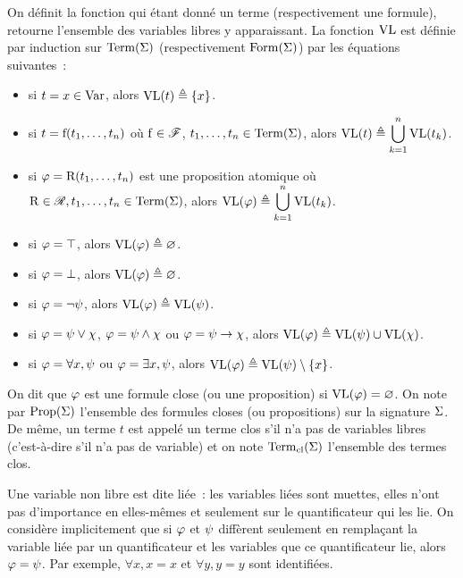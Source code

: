 \begin{definition}
  On définit la fonction qui étant donné un terme (respectivement une formule),
  retourne l'ensemble des variables libres y apparaissant. La fonction $\operatorname{VL}$ est
  définie par induction sur $\operatorname{Term}(\Sigma)$ (respectivement $\operatorname{Form}(\Sigma)$)
  par les équations suivantes~:
  \begin{itemize}
  \item si $t = x\in \operatorname{Var}$, alors $\operatorname{VL}(t) \triangleq \{x\}$.
  \item si $t = \mathrm{f}(t_1,\ldots,t_n)$ où $\mathrm{f}\in \mathscr F$,
    $t_1,\ldots,t_n\in\operatorname{Term}(\Sigma)$, alors
    $\displaystyle\operatorname{VL}(t) \triangleq \bigcup_{k = 1}^n \operatorname{VL}(t_k)$.
  \item si $\varphi = \mathrm{R}(t_1,\ldots,t_n)$ est une proposition
    atomique où $\mathrm{R}\in\mathscr R, t_1,\ldots,t_n\in\operatorname{Term}(\Sigma)$,
    alors $\displaystyle\operatorname{VL}(\varphi) \triangleq \bigcup_{k = 1}^n \operatorname{VL}(t_k)$.
  \item si $\varphi = \top$, alors $\operatorname{VL}(\varphi) \triangleq \varnothing$.
  \item si $\varphi = \bot$, alors $\operatorname{VL}(\varphi) \triangleq \varnothing$.
  \item si $\varphi = \lnot \psi$, alors $\operatorname{VL}(\varphi) \triangleq \operatorname{VL}(\psi)$.
  \item si $\varphi = \psi\lor\chi$, $\varphi = \psi\land \chi$ ou
    $\varphi = \psi\to\chi$, alors
    $\operatorname{VL}(\varphi) \triangleq \operatorname{VL}(\psi)\cup\operatorname{VL}(\chi)$.
  \item si $\varphi = \forall x, \psi$ ou $\varphi = \exists x, \psi$, alors
    $\operatorname{VL}(\varphi) \triangleq \operatorname{VL}(\psi)\setminus\{x\}$.
  \end{itemize}
  On dit que $\varphi$ est une formule close (ou une proposition) si
  $\operatorname{VL}(\varphi) = \varnothing$. On note par $\operatorname{Prop}(\Sigma)$ l'ensemble des
  formules closes (ou propositions) sur la signature $\Sigma$. De même, un
  terme $t$ est appelé un terme clos s'il n'a pas de variables libres
  (c'est-à-dire s'il n'a pas de variable) et on note $\operatorname{Term}_{\mathrm{cl}}(\Sigma)$ l'ensemble
  des termes clos.
\end{definition}

\begin{remark}\label{rmk.alpha}
  Une variable non libre est dite liée~: les variables liées sont muettes, elles
  n'ont pas d'importance en elles-mêmes et seulement sur le quantificateur qui
  les lie. On considère implicitement que si $\varphi$ et $\psi$ diffèrent
  seulement en remplaçant la variable liée par un quantificateur et les
  variables que ce quantificateur lie, alors $\varphi = \psi$.
  Par exemple, $\forall x, x = x$ et $\forall y, y = y$ sont identifiées.
\end{remark}

